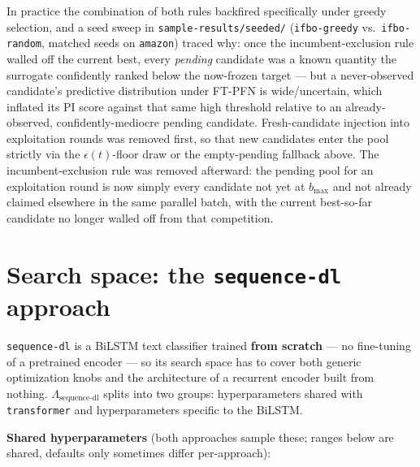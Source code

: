 \documentclass[10pt]{article}
\begin{document}
In practice the combination of both rules backfired specifically under greedy selection, and a
seed sweep in \texttt{sample-results/seeded/} (\texttt{ifbo-greedy} vs.\ \texttt{ifbo-random},
matched seeds on \texttt{amazon}) traced why: once the incumbent-exclusion rule walled off
the current best, every \emph{pending} candidate was a known quantity the surrogate confidently
ranked below the now-frozen target --- but a never-observed candidate's predictive distribution
under FT-PFN is wide/uncertain, which inflated its PI score against that same high threshold
relative to an already-observed, confidently-mediocre pending candidate. Fresh-candidate
injection into exploitation rounds was removed first, so that new candidates enter the pool
strictly via the $\epsilon(t)$-floor draw or the empty-pending fallback above. The
incumbent-exclusion rule was removed afterward: the pending pool for an exploitation round is
now simply every candidate not yet at $b_{\max}$ and not already claimed elsewhere in the same
parallel batch, with the current best-so-far candidate no longer walled off from that
competition.

\section*{Search space: the \texttt{sequence-dl} approach}

\texttt{sequence-dl} is a BiLSTM text classifier trained \textbf{from scratch} --- no fine-tuning of a pretrained
encoder --- so its search space has to cover both generic optimization knobs and the
architecture of a recurrent encoder built from nothing. $\Lambda_\text{sequence-dl}$ splits into
two groups: hyperparameters shared with \texttt{transformer} and hyperparameters specific to the BiLSTM.

\textbf{Shared hyperparameters} (both approaches sample these; ranges below are shared, defaults
only sometimes differ per-approach):
\end{document}
